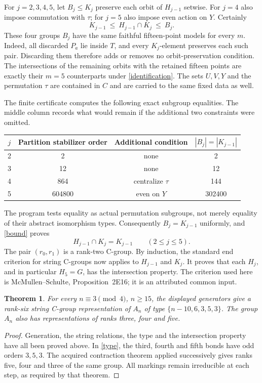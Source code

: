 \documentclass[11pt]{article}
\newtheorem{theorem}{Theorem}
\begin{document}
For $j=2,3,4,5$, let $B_j\leq K_j$ preserve each orbit of $H_{j-1}$
setwise. For $j=4$ also impose commutation with $\tau$; for $j=5$
also impose even action on $Y$. Certainly
\begin{equation}\label{bound}
 K_{j-1}\ \leq\ H_{j-1}\cap K_j\ \leq\ B_j.
\end{equation}
These four groups $B_j$ have the same faithful fifteen-point models for
every $m$. Indeed, all discarded $P_a$ lie inside $T$, and every
$K_j$-element preserves each such pair. Discarding them therefore adds
or removes no orbit-preservation condition. The intersections of the
remaining orbits with the retained fifteen points are exactly their
$m=5$ counterparts under \eqref{identification}. The sets $U,V,Y$ and
the permutation $\tau$ are contained in $C$ and are carried to the same
fixed data as well.

The finite certificate computes the following exact subgroup equalities.
The middle column records what would remain if the additional two
constraints were omitted.
\begin{center}
\begin{tabular}{cccc}
\toprule
$j$ & Partition stabilizer order & Additional condition & $|B_j|=|K_{j-1}|$\\\midrule
2 &2& none&2\\
3 &12& none&12\\
4 &864& centralize $\tau$&144\\
5 &604800& even on $Y$&302400\\\bottomrule
\end{tabular}
\end{center}
The program tests equality as actual permutation subgroups, not merely
equality of their abstract isomorphism types. Consequently
$B_j=K_{j-1}$ uniformly, and \eqref{bound} proves
\[
 H_{j-1}\cap K_j=K_{j-1}\qquad(2\leq j\leq5).
\]
The pair $(r_0,r_1)$ is a rank-two C-group. By induction, the standard
end criterion for string C-groups now applies to $H_{j-1}$ and $K_j$.
It proves that each $H_j$, and in particular $H_5=G$, has the intersection
property. The criterion used here is McMullen--Schulte, Proposition~2E16;
it is an attributed common input.

\begin{theorem}
For every $n\equiv3\pmod4$, $n\geq15$, the displayed generators give a
rank-six string C-group representation of $A_n$ of type
$\{n-10,6,3,5,3\}$. The group $A_n$ also has representations of ranks
three, four and five.
\end{theorem}
\begin{proof}
Generation, the string relations, the type and the intersection property
have all been proved above. In \eqref{type}, the third, fourth and fifth
bonds have odd orders $3,5,3$. The acquired contraction theorem applied
successively gives ranks five, four and three of the same group. All
markings remain irreducible at each step, as required by that theorem.
\end{proof}
\end{document}
